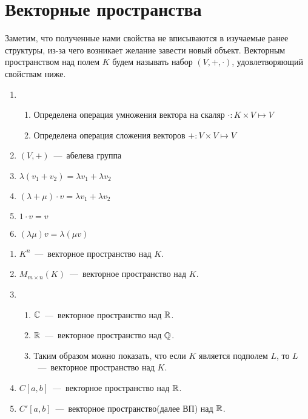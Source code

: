 \section{Векторные пространства}
Заметим, что полученные нами свойства не вписываются в изучаемые ранее структуры, из-за чего возникает желание завести новый объект. 
 Векторным пространством над полем $K$ будем называть набор $(V, +, \cdot)$, удовлетворяющий свойствам ниже.
\begin{properties}\leavevmode
    \begin{enumerate}
        \item 
            \begin{enumerate}
                \item Определена операция умножения вектора на скаляр $\cdot: K \times V \mapsto V$
                \item Определена операция сложения векторов $+: V \times V \mapsto V$
            \end{enumerate}
        \item $(V,+)$~---~абелева группа
        \item $\lambda(v_1 + v_2) = \lambda v_1 + \lambda v_2$
        \item $(\lambda + \mu)\cdot v = \lambda v_1 + \lambda v_2$
        \item $1\cdot v = v$
        \item $(\lambda\mu)v = \lambda(\mu v)$
    \end{enumerate}
\end{properties}
\begin{examples}\leavevmode
    \begin{enumerate}
        \item $K^n$~---~векторное пространство над $K$.
        \item $M_{m\times n}(K)$~---~векторное пространство над $K$.
        \item
            \begin{enumerate}
                \item $\mathbb{C}$~---~векторное пространство над $\mathbb{R}$.
                \item $\mathbb{R}$~---~векторное пространство над $\mathbb{Q}$.
                \item Таким образом можно показать, что если $K$ является подполем $L$, то $L$~---~векторное пространство над $K$.
            \end{enumerate}
        \item $C[a,b]$~---~векторное пространство над $\mathbb{R}$.
        \item $C'[a,b]$~---~векторное пространство(далее ВП) над $\mathbb{R}$.
    \end{enumerate}
\end{examples}
